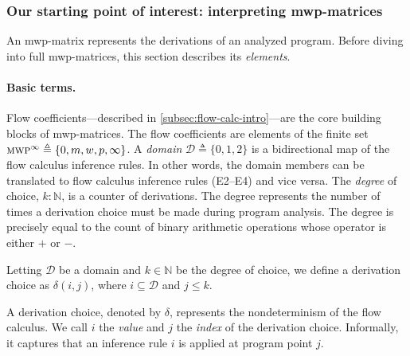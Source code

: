 \subsubsection{Our starting point of interest: interpreting mwp-matrices}
\label{subsec:mat-decode}

An mwp-matrix represents the derivations of an analyzed program.
Before diving into full mwp-matrices, this section describes its \emph{elements}.

\paragraph*{Basic terms.}
Flow coefficients---described in \autoref{subsec:flow-calc-intro}---are the core building blocks of mwp-matrices.
The flow coefficients are elements of the finite set \(\text{\textsc{mwp}}^\infty \triangleq \{0, m, w, p,\infty\}\).
A \emph{domain} \(\mathcal{D} \triangleq \{0, 1, 2 \}\) is a bidirectional map of the flow calculus inference rules.
In other words, the domain members can be translated to flow calculus inference rules (E2--E4) and vice versa.
The \emph{degree} of choice, \(k : \mathbb{N}\), is a counter of derivations.
The degree represents the number of times a derivation choice must be made during program analysis.
The degree is precisely equal to the count of binary arithmetic operations whose operator is either \(+\) or \(-\).

\begin{definition}
    Letting \( \mathcal{D} \) be a domain and \( k \in \mathbb{N} \) be the degree of choice,
    we define a derivation choice as \( \delta(i, j) \), where \( i \subseteq \mathcal{D} \) and \( j \leq k \).\end{definition}
A derivation choice, denoted by \(\delta\), represents the nondeterminism of the flow calculus.
We call \(i\) the \emph{value} and \(j\) the \emph{index} of the derivation choice.
Informally, it captures that an inference rule \(i\) is applied at program point \(j\).

